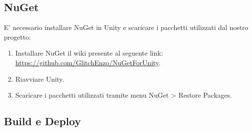 \subsection{NuGet}
E' necessario installare NuGet in Unity e scaricare i pacchetti utilizzati dal nostro progetto:

\begin{enumerate}
    \item Installare NuGet il wiki presente al seguente link: \url{https://github.com/GlitchEnzo/NuGetForUnity}.
    \item Riavviare Unity.
    \item Scaricare i pacchetti utilizzati tramite menu NuGet > Restore Packages.
\end{enumerate}

\subsection{Build e Deploy}


